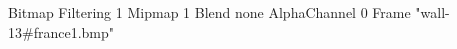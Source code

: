 {Bitmap
	{Filtering 1}
	{Mipmap 1}
	{Blend none}
	{AlphaChannel 0}
	{Frame "wall-13#france1.bmp"}
}
